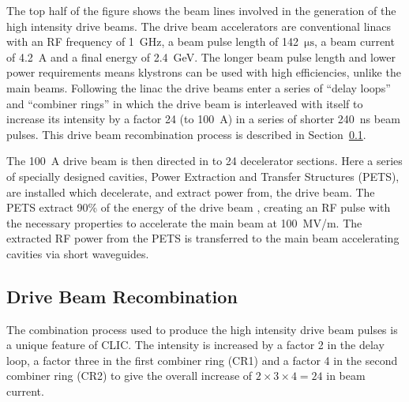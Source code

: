 The top half of the figure shows the beam lines involved in the generation of the high intensity drive beams. The drive beam accelerators are conventional linacs with an RF frequency of 1~GHz, a beam pulse length of 142~\(\mathrm{\mu s}\), a beam current of 4.2~A and a final energy of 2.4~GeV. The longer beam pulse length and lower power requirements means klystrons can be used with high efficiencies, unlike the main beams. Following the linac the drive beams enter a series of ``delay loops'' and ``combiner rings'' in which the drive beam is interleaved with itself to increase its intensity by a factor 24 (to 100~A) in a series of shorter 240~ns beam pulses. This drive beam recombination process is described in Section~\ref{ss:clicCombination}.

The 100~A drive beam is then directed in to 24 decelerator sections. Here a series of specially designed cavities, Power Extraction and Transfer Structures (PETS), are installed which decelerate, and extract power from, the drive beam. The PETS extract 90\% of the energy of the drive beam \cite{clicCDR}, creating an RF pulse with the necessary properties to accelerate the main beam at 100~MV/m. The extracted RF power from the PETS is transferred to the main beam accelerating cavities via short waveguides.

\subsection{Drive Beam Recombination}
\label{ss:clicCombination}

The combination process used to produce the high intensity drive beam pulses is a unique feature of CLIC. The intensity is increased by a factor 2 in the delay loop, a factor three in the first combiner ring (CR1) and a factor 4 in the second combiner ring (CR2) to give the overall increase of \(2 \times 3 \times 4 = 24\) in beam current. 

